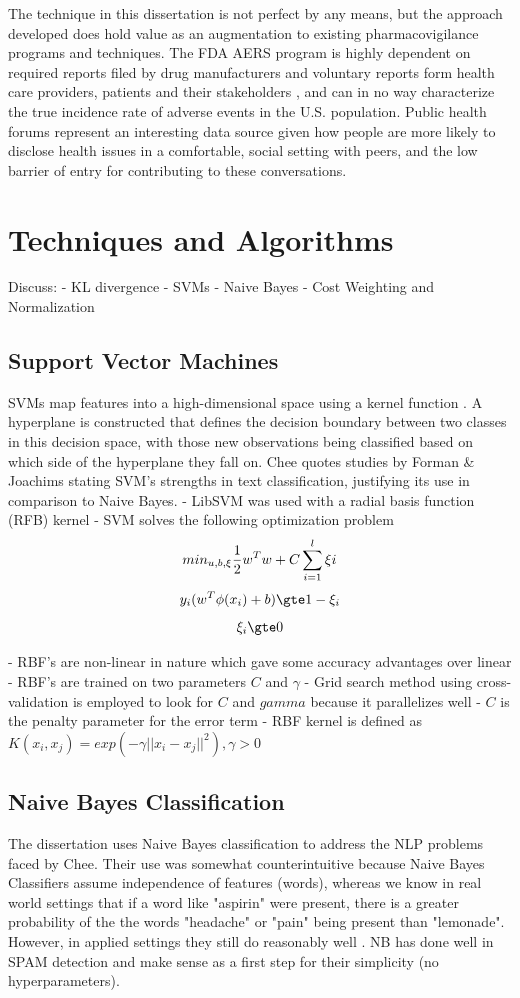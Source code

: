 \documentclass[twoside,11pt]{article}
\begin{document}
The technique in this dissertation is not perfect by any means, but the approach developed does hold value as an augmentation to existing pharmacovigilance programs and techniques. The FDA AERS program is highly dependent on required reports filed by drug manufacturers and voluntary reports form health care providers, patients and their stakeholders \citep{FDA Aers}, and can in no way characterize the true incidence rate of adverse events in the U.S. population. Public health forums represent an interesting data source given how people are more likely to disclose health issues in a comfortable, social setting with peers, and the low barrier of entry for contributing to these conversations.


\section{Techniques and Algorithms}

Discuss:
   - KL divergence
   - SVMs
   - Naive Bayes
  - Cost Weighting and Normalization


\subsection{Support Vector Machines}
SVMs map features into a high-dimensional space using a kernel function \citep{Cortes and Vapnik}.
A hyperplane is constructed that defines the decision boundary between two classes
in this decision space, with those new observations being classified based on which
side of the hyperplane they fall on. Chee quotes studies by Forman & Joachims stating
SVM's strengths in text classification, justifying its use in comparison to Naive
Bayes.
- LibSVM was used with a radial basis function (RFB) kernel
- SVM solves the following optimization problem
\[
  min_{u, b, \xi} \frac{1}{2}w^{T}w + C \sum_{i=1}^{l}\xi i \\
\]
\[
  y_{i}(w^{T}\phi(x_{i}) + b) \gte 1 - \xi_{i}
\]
\[
  \xi_{i} \gte 0
\]

- RBF's are non-linear in nature which gave some accuracy advantages over linear
- RBF's are trained on two parameters $C$ and $\gamma$
- Grid search method using cross-validation is employed to look for $C$ and $gamma$
because it parallelizes well
- $C$ is the penalty parameter for the error term
- RBF kernel is defined as $K(x_i, x_j) = exp(-\gamma||x_i - x_j||^{2}), \gamma > 0$

\subsection{Naive Bayes Classification}
The dissertation uses Naive Bayes classification to address the NLP problems
faced by Chee.  Their use was somewhat counterintuitive because Naive Bayes
Classifiers assume independence of features (words), whereas we know in real world settings
that if a word like "aspirin" were present, there is a greater probability of the
the words "headache" or "pain" being present than "lemonade". However, in
applied settings they still do reasonably well \citep{Manning, 1999}. NB has done well
in SPAM detection \citep{Sahami} and make sense as a first step for their simplicity (no
hyperparameters).
\end{document}
